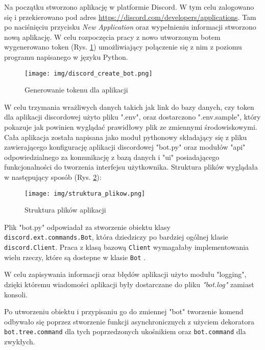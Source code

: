 \documentclass[12pt,a4paper]{article}
\newcommand{\classname}[1]{\texttt{#1}}
\begin{document}
Na początku stworzono aplikację w platformie Discord. W tym celu zalogowano się i przekierowano pod adres \href{https://discord.com/developers/applications}{https://discord.com/developers/applications}. Tam po naciśnięciu przycisku \textit{New Application} oraz wypełnieniu informacji stworzono nową aplikację. W celu rozpoczęcia pracy z nowo utworzonym botem wygenerowano token (Rys. \ref{img: discord_gen_token}) umożliwiający połączenie się z nim z poziomu programu napisanego w języku Python.
\begin{figure}[H]
    \centering
    \texttt{[image: img/discord\_create\_bot.png]}
    \caption{Generowanie tokenu dla aplikacji}
    \label{img: discord_gen_token}
\end{figure}

W celu trzymania wrażliwych danych takich jak link do bazy danych, czy token dla aplikacji discordowej użyto pliku ".env", oraz dostarczono ".env.sample", który pokazuje jak powinien wyglądać prawidłowy plik ze zmiennymi środowiskowymi. Cała aplikacja została napisana jako moduł pythonowy składający się z pliku zawierającego konfigurację aplikacji discordowej "bot.py" oraz modułów "api" odpowiedzialnego za komunikację z bazą danych i "ui" posiadającego funkcjonalności do tworzenia interfejsu użytkownika. Struktura plików wyglądała w następujący sposób (Rys. \ref{img: struktura_plikow}):

\begin{figure}[H]
    \centering
    \texttt{[image: img/struktura\_plikow.png]}
    \caption{Struktura plików aplikacji}
    \label{img: struktura_plikow}
\end{figure}

Plik "bot.py" odpowiadał za stworzenie obiektu klasy \classname{discord.ext.commands.Bot}, która dziedziczy po bardziej ogólnej klasie \classname{discord.Client}. Praca z klasą bazową \classname{Client} wymagałaby implementowania wielu rzeczy, które są dostepne w klasie \classname{Bot} \cite{BotVsClientArticle}. 

W celu zapisywania informacji oraz błędów aplikacji użyto modułu "logging", dzięki któremu wiadomości aplikacji były dostarczane do pliku \textit{"bot.log"} zamiast konsoli.

Po utworzeniu obiektu i przypisaniu go do zmiennej "bot" tworzenie komend odbywało się poprzez stworzenie funkcji asynchronicznych z użyciem dekoratora \classname{bot.tree.command} dla tych poprzedzonych ukośnikiem oraz \classname{bot.command} dla zwykłych.
\end{document}
